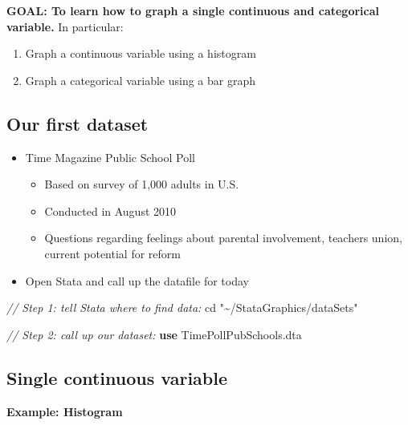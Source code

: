 \documentclass[
]{book}
\newenvironment{Shaded}{\begin{snugshade}}{\end{snugshade}}
\newcommand{\CommentTok}[1]{\textcolor[rgb]{0.56,0.35,0.01}{\textit{#1}}}
\newcommand{\KeywordTok}[1]{\textcolor[rgb]{0.13,0.29,0.53}{\textbf{#1}}}
\newcommand{\NormalTok}[1]{#1}
\newcommand{\StringTok}[1]{\textcolor[rgb]{0.31,0.60,0.02}{#1}}
\providecommand{\tightlist}{%
  \setlength{\itemsep}{0pt}\setlength{\parskip}{0pt}}
\begin{document}
\textbf{GOAL: To learn how to graph a single continuous and categorical variable.} In particular:

\begin{enumerate}
\def\labelenumi{\arabic{enumi}.}
\tightlist
\item
  Graph a continuous variable using a histogram
\item
  Graph a categorical variable using a bar graph
\end{enumerate}

\hypertarget{our-first-dataset}{%
\subsection{Our first dataset}\label{our-first-dataset}}

\begin{itemize}
\tightlist
\item
  Time Magazine Public School Poll

  \begin{itemize}
  \tightlist
  \item
    Based on survey of 1,000 adults in U.S.
  \item
    Conducted in August 2010
  \item
    Questions regarding feelings about parental involvement, teachers union, current potential for reform
  \end{itemize}
\item
  Open Stata and call up the datafile for today
\end{itemize}

\begin{Shaded}
\begin{Highlighting}[]
\CommentTok{// Step 1: tell Stata where to find data:}
\NormalTok{cd }\StringTok{"\textasciitilde{}/StataGraphics/dataSets"}

\CommentTok{// Step 2: call up our dataset:}
\KeywordTok{use}\NormalTok{ TimePollPubSchools.dta}
\end{Highlighting}
\end{Shaded}

\hypertarget{single-continuous-variable}{%
\subsection{Single continuous variable}\label{single-continuous-variable}}

\textbf{Example: Histogram}
\end{document}
